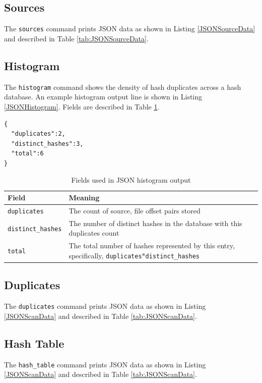 \documentclass[11pt,fleqn]{article} %
\begin{document}
\subsection{Sources}
The \verb+sources+ command prints JSON data as shown in Listing \ref{JSONSourceData} and described in Table \ref{tab:JSONSourceData}.\\

\subsection{Histogram}
The \verb+histogram+ command shows the density of hash duplicates across a hash database.  An example histogram output line is shown in Listing \ref{JSONHistogram}.  Fields are described in Table \ref{tab:JSONHistogram}.\\

\lstset{style=customfile}
\begin{lstlisting}[caption={Example JSON histogram format}, label=JSONHistogram]
{
  "duplicates":2,
  "distinct_hashes":3,
  "total":6
}
\end{lstlisting}

\begin{table}[!ht]

\centering
\caption{Fields used in JSON histogram output}
\label{tab:JSONHistogram}
\begin{tabular}{|p{5 cm}|p{8.8 cm}|}
\hline \hline
\textbf{Field} & \textbf{Meaning} \\
\hline
\verb+duplicates+ & The count of source, file offset pairs stored\\
\hline
\verb+distinct_hashes+ & The number of distinct hashes in the database with this duplicates count\\
\hline
\verb+total+ & The total number of hashes represented by this entry, specifically, \verb+duplicates+$*$\verb+distinct_hashes+\\
\hline
\end{tabular}
\end{table}

\subsection{Duplicates}
The \verb+duplicates+ command prints JSON data as shown in Listing \ref{JSONScanData} and described in Table \ref{tab:JSONScanData}.\\

\subsection{Hash Table}
The \verb+hash_table+ command prints JSON data as shown in Listing \ref{JSONScanData} and described in Table \ref{tab:JSONScanData}.\\
\end{document}
